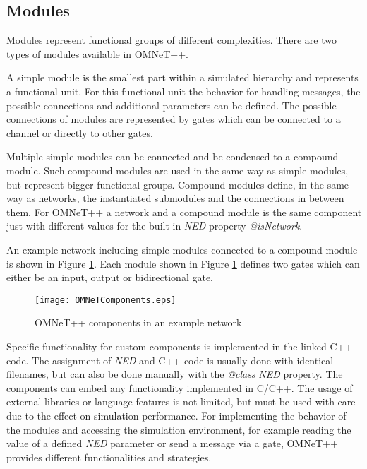 \subsection{Modules}
\label{sec:omnet_components_modules}
Modules represent functional groups of different complexities.
There are two types of modules available in OMNeT++.

A simple module is the smallest part within a simulated hierarchy and represents a functional unit.
For this functional unit the behavior for handling messages, the possible connections and additional parameters can be defined. \cite[section 3.3]{omnet_manual}
The possible connections of modules are represented by gates which can be connected to a channel or directly to other gates.

Multiple simple modules can be connected and be condensed to a compound module.
Such compound modules are used in the same way as simple modules, but represent bigger functional groups.
Compound modules define, in the same way as networks, the instantiated submodules and the connections in between them. \cite[section 3.4]{omnet_manual}
For OMNeT++ a network and a compound module is the same component just with different values for the built in \emph{NED} property \emph{@isNetwork}.

An example network including simple modules connected to a compound module is shown in Figure \ref{fig:OMNeTComponents}.
Each module shown in Figure \ref{fig:OMNeTComponents} defines two gates which can either be an input, output or bidirectional gate.

\begin{figure}
    \centering
    \texttt{[image: OMNeTComponents.eps]}
    \caption{OMNeT++ components in an example network}
    \label{fig:OMNeTComponents}
\end{figure}

Specific functionality for custom components is implemented in the linked C++ code.
The assignment of \emph{NED} and C++ code is usually done with identical filenames, but can also be done manually with the \emph{@class} \emph{NED} property.
The components can embed any functionality implemented in C/C++.
The usage of external libraries or language features is not limited, but must be used with care due to the effect on simulation performance.
For implementing the behavior of the modules and accessing the simulation environment, for example reading the value of a defined \emph{NED} parameter or send a message via a gate, 
OMNeT++ provides different functionalities and strategies.

